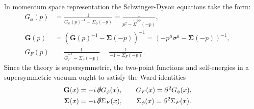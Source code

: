 \documentclass[11pt]{article}
\newcommand{\phib}{\bar{\phi}}
\newcommand{\Gt}{\widetilde{G}}
\newcommand{\Sigt}{\widetilde{\Sigma}}
\begin{document}
In momentum space representation the Schwinger-Dyson equations take the form:
%
\begin{equation}\label{eq:3dSDmom}
\begin{split}
G_\phi(p)
&= \frac{1}{\Gt_\phi(p)^{-1}-\Sigma_\phi(-p)}
	= \frac{1}{ p^2-\Sigt^{\phib\phi}(-p)},
\\
\mathbf{G}(p)
&= 
	\left(\widetilde{\mathbf{G}}(p)^{-1}- \bm{\Sigma}(- p)\right)^{-1}
	=\left(-p^\mu\sigma^\mu-\bm{\Sigma}(- p)\right)^{-1},
\\
G_F(p)
&=
	\frac{1}{\Gt_F^{-1}-\Sigma_F(-p)}
	= \frac{1}{ -1-\Sigma_F(-p)} \,.
\end{split}
\end{equation}	
%
Since the theory is supersymmetric, the two-point functions and self-energies in a supersymmetric vacuum ought to satisfy the Ward identities 
%
\begin{equation}\label{eq:susyWard}
\begin{split}
\mathbf{G}(x) 
&=
	-i \,\slashed{\partial} G_\phi(x),\qquad G_F(x)=\partial^2G_\phi(x), \\
\bm{\Sigma}(x) 
&=
	-i \,\slashed{\partial} \Sigma_{F}(x),\qquad \Sigma_\phi(x)=\partial^2\Sigma_F(x).
\end{split}
\end{equation}	
%
\end{document}
